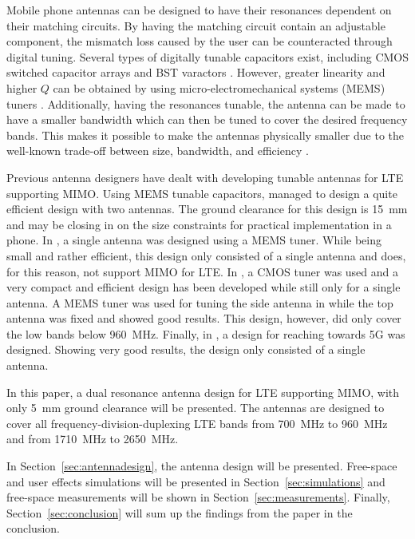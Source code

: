 Mobile phone antennas can be designed to have their resonances dependent on their matching circuits. By having the matching circuit contain an adjustable component, the mismatch loss caused by the user can be counteracted through digital tuning. Several types of digitally tunable capacitors exist, including CMOS switched capacitor arrays and BST varactors \cite{gu2014rf}. However, greater linearity and higher $Q$ can be obtained by using micro-electromechanical systems (MEMS) tuners \cite{gu2014rf}. Additionally, having the resonances tunable, the antenna can be made to have a smaller bandwidth which can then be tuned to cover the desired frequency bands. This makes it possible to make the antennas physically smaller due to the well-known trade-off between size, bandwidth, and efficiency \cite{hilbert2015tradeoff}.

Previous antenna designers have dealt with developing tunable antennas for LTE supporting MIMO. Using MEMS tunable capacitors, \cite{ilvonen2014multiband} managed to design a quite efficient design with two antennas. The ground clearance for this design is \SI{15}{mm} and may be closing in on the size constraints for practical implementation in a phone. In \cite{morris2014tunable}, a single antenna was designed using a MEMS tuner. While being small and rather efficient, this design only consisted of a single antenna and does, for this reason, not support MIMO for LTE. In \cite{xia2015compact}, a CMOS tuner was used and a very compact and efficient design has been developed while still only for a single antenna. A MEMS tuner was used for tuning the side antenna in \cite{tatomirescu2015alternative} while the top antenna was fixed and showed good results. This design, however, did only cover the low bands below \SI{960}{MHz}. Finally, in \cite{trinh2016reconfigurable}, a design for reaching towards 5G was designed. Showing very good results, the design only consisted of a single antenna.

In this paper, a dual resonance antenna design for LTE supporting MIMO, with only \SI{5}{mm} ground clearance will be presented. The antennas are designed to cover all frequency-division-duplexing LTE bands from \SI{700}{MHz} to \SI{960}{MHz} and from \SI{1710}{MHz} to \SI{2650}{MHz}.

In Section~\ref{sec:antennadesign}, the antenna design will be presented. Free-space and user effects simulations will be presented in Section~\ref{sec:simulations} and free-space measurements will be shown in Section~\ref{sec:measurements}. Finally, Section~\ref{sec:conclusion} will sum up the findings from the paper in the conclusion.

